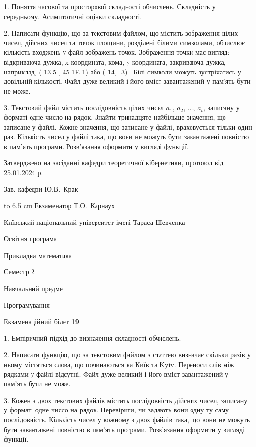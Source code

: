 \documentclass[12pt, ukrainian]{article}
\begin{document}
{%
1. Поняття часової та просторової складності обчислень. Складність у середньому. Асимптотичні оцінки складності.%
\par
2. Написати функцію, що за текстовим файлом, що містить зображення цілих чисел, дійсних чисел та точок площини, розділені білими символами, обчислює кількість входжень у файл зображень точок. Зображення точки має вигляд: відкриваюча дужка, x-координата, кома, y-координата, закриваюча дужка, наприклад, ( 13.5 , 45.1E-1) або ( 14, -3) . Білі символи можуть зустрічатись у довільній кількості. Файл дуже великий і його вміст завантажений у пам'ять бути не може.

\par
3. Текстовий файл містить послідовність цілих чисел $a_1$, $a_2$, $\ldots$, $a_t$, записану у форматі одне число на рядок. Знайти тринадцяте найбільше значення, що записане у файлі. Кожне значення, що записане у файлі, враховується тільки один раз. Кількість чисел у файлі така, що вони не можуть бути завантажені повністю в пам'ять програми. Розв'язання оформити у вигляді функції.

}
{\smallskip\smallskip \begin {scriptsize} Затверджено на засіданні кафедри теоретичної кібернетики, протокол   від   25.01.2024 р.\par\smallskip\smallskip\smallskip\smallskip
{\parbox {6.5 cm} {Зав. кафедри \dotfill Ю.В.~Крак}}\hspace {0.7cm} {\hbox to 6.5 cm { Екзаменатор \dotfill Т.О.~Карнаух}} \end{scriptsize}}
\newpage
{{\begin {scriptsize}\par
{ \center  Київський національний університет імені Тараса Шевченка \par}
{\parbox {5 cm}{Освітня програма \hfill}{\parbox {7 cm}{Прикладна математика\hfill}}\parbox {6 cm}{\hfill Семестр 2}}\par
{\parbox {5 cm} {Навчальний предмет \hfill}\parbox {7 cm}{Програмування \hfill}\parbox {6cm}{\hfill}\par}\vspace{-15pt} \end{scriptsize}}{\center Екзаменаційний білет \No \textbf { 19 }\par}}
{%
1. Емпіричний підхід до визначення складності обчислень.%
\par
2. Написати функцію, що за текстовим файлом з статтею визначає скільки разів у ньому містяться слова, що починаються на Київ та Kyiv.  Переноси слів між рядками у файлі відсутні. Файл дуже великий і його вміст завантажений у пам'ять бути не може.

\par
3. Кожен з двох текстових файлів містить послідовність дійсних чисел, записану у форматі одне число на рядок.  Перевірити, чи задають вони одну ту саму послідовність. Кількість чисел у кожному з двох файлів така, що вони не можуть бути завантажені повністю в пам'ять програми. Розв'язання оформити у вигляді функції.

}
\end{document}
